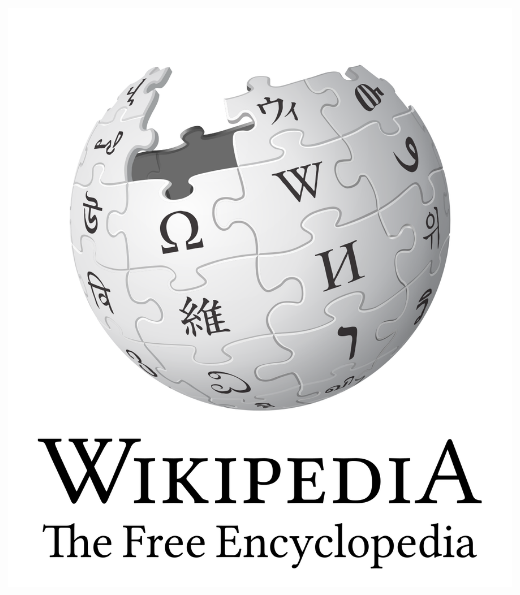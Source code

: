 \documentclass[10pt]{beamer}
\begin{document}
\begin{frame}[t]
\begin{columns}[t]
		\begin{column}{0.33\textwidth}
			\begin{center}
				\vspace{0.5cm}
				\includegraphics[width=1.3\textwidth]{figures/wikipedia.png}
			\end{center}
		\end{column}
		

\end{columns}
\end{frame}
\end{document}
